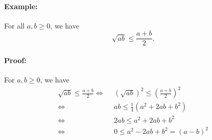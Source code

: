\documentclass[twocolumn]{article}
\begin{document}
			\paragraph{Example:}
				For all $a,b\ge 0$, we have 
				\[
				\sqrt{ab}\le\frac{a+b}{2}
				.\] 
			\paragraph{Proof:}
				For $a,b\ge0$, we have
				\[  
				\begin{split}
					\sqrt{ab}\le\frac{a+b}{2}\Leftrightarrow & 
					~~(\sqrt{ab})^2\le(\frac{a+b}{2})^2 \\
					\Leftrightarrow & ~~ab\le \frac{1}{4}(a^2+2ab+b^2)\\
					\Leftrightarrow & ~~ 2ab\le a^2+2ab+b^2\\
					\Leftrightarrow & ~~ 0\le a^2-2ab+b^2=(a-b)^2
				\end{split}
				\]   
\end{document}
